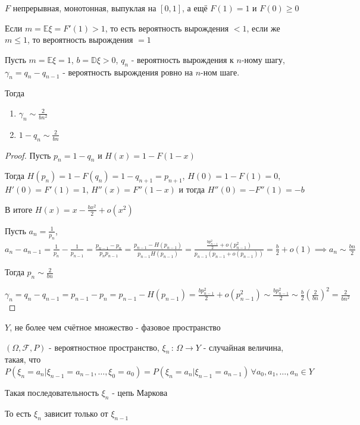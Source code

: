 \begin{remark}
    $F$ непрерывная, монотонная, выпуклая на $[0, 1]$, а ещё $F(1) = 1$ и $F(0) \geqslant 0$


    Если $m = \mathbb{E} \xi = F' (1) > 1$, то есть вероятность вырождения $< 1$, если же $m \leqslant 1$, то вероятность вырождения $= 1$
\end{remark}

\begin{theorem}
    Пусть $m = \mathbb{E} \xi = 1$, $b = \mathbb{D} \xi > 0$, $q_n$ - вероятность вырождения к $n$-ному шагу, $\gamma_n = q_n - q_{n-1}$ - вероятность вырождения ровно на $n$-ном шаге.

    Тогда
    \begin{enumerate}
        \item $\gamma_n \sim \frac{2}{bn^2}$
        \item $1 - q_n \sim \frac{2}{bn}$
    \end{enumerate}
\end{theorem}

\begin{proof}
    Пусть $p_n = 1 - q_n$ и $H(x) = 1 - F(1 - x)$

    Тогда $H(p_n) = 1 - F(q_n) = 1 - q_{n+1} = p_{n+1}$, $H(0) = 1 - F(1) = 0$, $H'(0) = F'(1) = 1$, $H''(x) = F''(1 - x)$ и тогда $H''(0) = -F''(1) = -b$

    В итоге $H(x) = x - \frac{bx^2}{2} + o(x^2)$

    Пусть $a_n = \frac{1}{p_n}$, $a_n - a_{n-1} = \frac{1}{p_n} - \frac{1}{p_{n-1}} = \frac{p_{n-1} - p_n}{p_np_{n-1}} = \frac{p_{n-1} - H(p_{n-1})}{p_{n-1}H(p_{n-1})} = 
    \frac{\frac{bp_{n-1}^2}{2} + o(p_{n-1}^2)}{p_{n-1}(p_{n-1} + o(p_{n-1}))} = \frac{b}{2} + o(1) \implies a_n \sim \frac{bn}{2}$

    Тогда $p_n \sim \frac{2}{bn}$

    $\gamma_n = q_{n} - q_{n- 1} = p_{n-1} - p_n = p_{n-1} - H(p_{n-1}) = \frac{bp_{n-1}^2}{2} + o(p_{n-1}^2) \sim \frac{bp_{n-1}^2}{2} \sim \frac{b}{2} \left( \frac{2}{bn} \right)^2 = \frac{2}{bn^2}$
\end{proof}


\begin{definition}
    $Y$, не более чем счётное множество - фазовое пространство

    $(\Omega, \mathcal{F}, P)$ - вероятностное пространство, $\xi_n \, : \, \Omega \to Y$ - случайная величина, такая, что
    $P(\xi_n = a_n | \xi_{n - 1} = a_{n - 1}, \ldots, \xi_0 = a_0) = P(\xi_n = a_n | \xi_{n - 1} = a_{n-1}) \, \forall a_0, a_1, \ldots, a_n \in Y$

    Такая последовательность $\xi_n$ - цепь Маркова

    \begin{remark}
        То есть $\xi_n$ зависит только от $\xi_{n-1}$
    \end{remark}
\end{definition}

